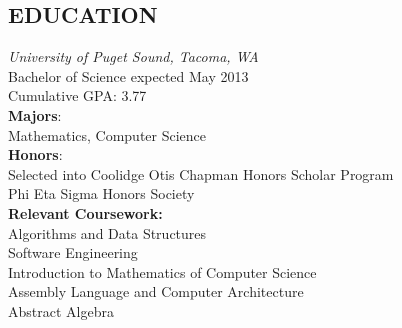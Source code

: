 \documentclass[line,margin,11pt]{res}
\begin{document}
\address{1311 N. Alder, Tacoma, WA 98406} 
\address{kwenholz@pugetsound.edu\hspace*{2mm} \vline \hspace*{2mm} (406)546-9210}

 
\begin{resume}
\vspace*{.3cm}

 
\section{EDUCATION} {\sl University of Puget Sound, Tacoma, WA} \\
                Bachelor of Science
                expected May 2013 \\
                Cumulative GPA: 3.77\\
                \textbf{Majors}: \\
\hspace*{5mm}                Mathematics, Computer Science \\
                \textbf{Honors}:\\
\hspace*{5mm}   Selected into Coolidge Otis Chapman Honors Scholar Program\\
\hspace*{5mm}   Phi Eta Sigma Honors Society\\
                \textbf{Relevant Coursework:}\\ 
\hspace*{5mm}                   Algorithms and Data Structures\\
\hspace*{5mm}                   Software Engineering\\
\hspace*{5mm}                   Introduction to Mathematics of Computer Science\\
\hspace*{5mm}                   Assembly Language and Computer Architecture\\
\hspace*{5mm}                   Abstract Algebra
      

\end{resume}
\end{document}
